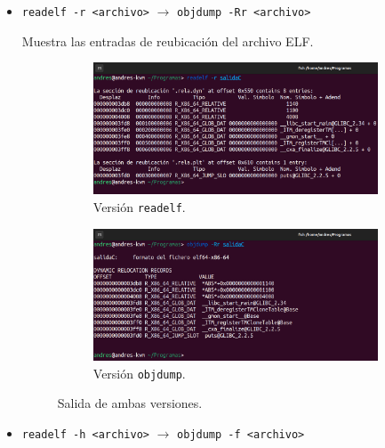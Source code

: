 \documentclass{article}
\begin{document}
\begin{itemize}
    \item \verb|readelf -r <archivo>| $\rightarrow$ \verb|objdump -Rr <archivo>|
    
    
    Muestra las entradas de reubicación del archivo ELF.

    \begin{figure}[H]
        \centering
        \begin{subfigure}{0.49\textwidth}
            \centering
            \includegraphics[width=\textwidth]{imagenes/Captura desde 2022-11-17 17-42-30.png}
            \caption{Versión \texttt{readelf}.}
        \end{subfigure}
        \hfill
        \begin{subfigure}{0.49\textwidth}
            \centering
            \includegraphics[width=\textwidth]{imagenes/Captura desde 2022-11-17 17-42-36.png}
            \caption{Versión \texttt{objdump}.}
        \end{subfigure}
        \caption{Salida de ambas versiones.}
    \end{figure}

    \newpage

    \item \verb|readelf -h <archivo>| $\rightarrow$ \verb|objdump -f <archivo>|
    

\end{itemize}
\end{document}
